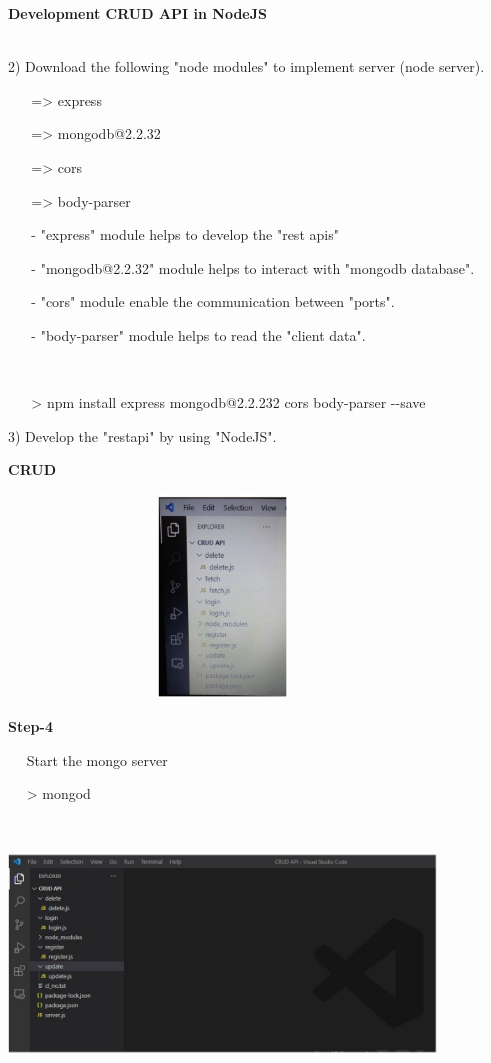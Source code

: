\documentclass[
]{article}
\author{}
\date{}
\begin{document}
{\textbf{Development CRUD API in NodeJS}}

{\textbf{}}\strut \\

2) Download the following "node modules" to implement server (node
server).

{~ ~ }=\textgreater{} express

{~ ~ }=\textgreater{} mongodb@2.2.32

{~ ~ }=\textgreater{} cors

{~ ~ }=\textgreater{} body-parser

\hfill    

{~ ~ }- "express" module helps to develop the "rest apis"

{~ ~ }- "mongodb@2.2.32" module helps to interact with "mongodb
database".

{~ ~ }- "cors" module enable the communication between "ports".

{~ ~ }- "body-parser" module helps to read the "client data".

{~}

{~ ~ }\textgreater{} npm install express mongodb@2.2.232 cors
body-parser -\/-save

\hfill    

3) Develop the "restapi" by using "NodeJS".

\hfill    


{\textbf{CRUD}}

\begin{center}
	\includegraphics*[width=4.48in, height=2.13in]{IMG-05-01}
\end{center}

\hfill    
\newpage
{\textbf{Step-4}}

{~~ }Start the mongo server

{~~ }\textgreater{} mongod

{~ ~}

\hfill    

\begin{center}
	\includegraphics*[width=4.48in, height=2.13in]{IMG-05-02}
\end{center}
\end{document}
